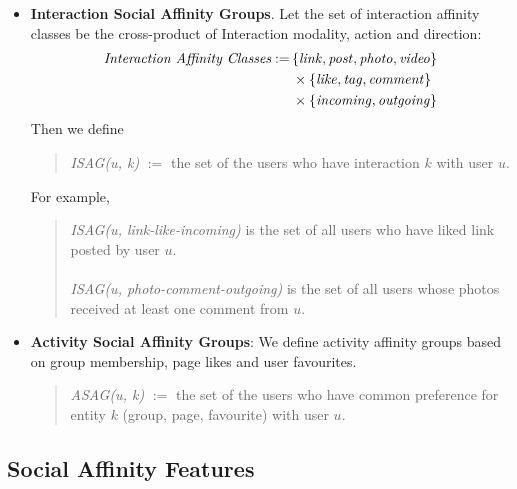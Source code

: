 \begin{itemize}
  \item \textbf{Interaction  Social Affinity Groups}. Let the set of interaction affinity classes be the cross-product of 
  Interaction modality, action and direction:
  \begin{align*}
  	\textit{Interaction Affinity Classes} := \, & \{\link, \post, \photo, \video\} \\
                                                & \times \{\like, \ttag, \comment\} \\
                                                & \times \{\incoming, \outgoing\}
  \end{align*}
  Then we define 
  \begin{quote}
  \textit{ISAG(u, k)} $:=$ the set of the users who have interaction $k$ with user $u$.
  \end{quote}
   For example,
   \begin{quote}
   
   \textit{ISAG(u, link-like-incoming)}  is the set of all users who have liked link posted by user $u$. \\
   \\
   \textit{ISAG(u, photo-comment-outgoing)} is the set of all users whose photos received at least one comment from $u$.
   \end{quote}
\item \textbf{Activity Social Affinity Groups}: We define activity affinity groups based on group membership, page likes and user favourites.
	\begin{quote}
	\textit{ASAG(u, k)} $:=$ the set of the users who have common preference for entity $k$ (group, page, favourite) with user $u$.   
	\end{quote}
\end{itemize}


\subsection{Social Affinity Features}
\label{ssec:SAfeature}

